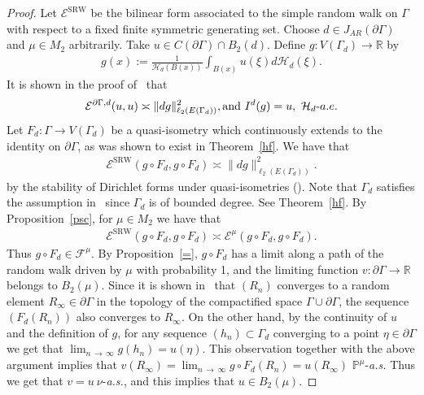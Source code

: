\documentclass[10pt]{amsart}
\theoremstyle{definition}\newtheorem{defi}[theo]{Definition}\newtheorem{rema}[theo]{Remark}\newtheorem{exam}[theo]{Example}\newtheorem{exem}[theo]{Example}\newtheorem{nota}[theo]{Notation}
\newcommand{\ce}{\mathcal{E}}
\newcommand{\cf}{\mathcal{F}}
\newcommand{\ch}{\mathcal{H}}
\newcommand{\bp}{\mathbb{P}}
\newcommand{\br}{\mathbb{R}}
\newcommand{\SRW}{\mathrm{SRW}}
\begin{document}
\begin{proof}
Let $ \ce^{\SRW}$ be the bilinear form associated to the simple random walk on $\Gamma$ with respect to a fixed finite symmetric generating set. Choose $d\in J_{AR}(\partial\Gamma)$ and $\mu\in M_2$ arbitrarily. Take $u\in C(\partial\Gamma)\cap B_2(d)$. Define $g:V(\Gamma_{d})\rightarrow\br$ by
\begin{align}\label{exx}
g(x):=\frac{1}{\ch_{d}(B(x))}\int_{B(x)}u(\xi)d\ch_{d}(\xi).
\end{align}
It is shown in the proof of~\cite[Theorem~3.4]{BP} that
\begin{align*}
\ce^{\partial\Gamma,d}(u,u)\asymp \|dg\|^2_{\ell_2(E(\Gamma_{d}))},\text{and}\ I^{d}(g)=u,\ \ch_{d}\mathchar`-a.e.
\end{align*}
Let $F_{d}:\Gamma\rightarrow V(\Gamma_{d})$ be a quasi-isometry which continuously extends to the identity on $\partial\Gamma$, as was shown to exist in Theorem~\ref{hf}. We have that
\begin{align*}
\ce^{\SRW}(g\circ F_{d},g\circ F_{d})\asymp \|dg\|^2_{\ell_2(E(\Gamma_{d}))}.
\end{align*}
by the stability of Dirichlet forms under quasi-isometries (\cite[Theorem~3.10]{Woe}). Note that $\Gamma_{d}$ satisfies the assumption in~\cite[Theorem~3.10]{Woe} since $\Gamma_{d}$ is of bounded degree. See Theorem~\ref{hf}. By Proposition~\ref{psc}, for $\mu\in M_2$ we have that
\begin{align*}
\ce^{\SRW}(g\circ F_{d},g\circ F_{d})\asymp \ce^{\mu}(g\circ F_{d},g\circ F_{d}).
\end{align*}
Thus $g\circ F_{d}\in\cf^{\mu}$. By Proposition~\ref{=}, $g\circ F_{d}$ has a limit along a path of the random walk driven by $\mu$ with probability 1, and the limiting function $v:\partial \Gamma\rightarrow\br$ belongs to $B_2(\mu)$. Since it is shown in~\cite{Ka} that $(R_n)$ converges to a random element $R_{\infty}\in\partial\Gamma$ in the topology of the compactified space $\Gamma\cup\partial\Gamma$, the sequence $(F_{d}(R_n))$ also converges to $R_{\infty}$. On the other hand, by the continuity of $u$ and the definition of $g$, for any sequence $(h_n)\subset\Gamma_{d}$ converging to a point $\eta\in\partial\Gamma$ we get that $\lim_{n\,\to\,\infty}g(h_n)=u(\eta)$. This observation together with the above argument implies that $v(R_\infty)=\lim_{n\,\to\,\infty}g\circ F_{d}(R_n)=u(R_{\infty})$ $\bp^{\mu}$-\emph{a.s.} Thus we get that $v=u\ \nu$-\emph{a.s.}, and this implies that $u\in B_2(\mu)$.


\end{proof}
\end{document}
